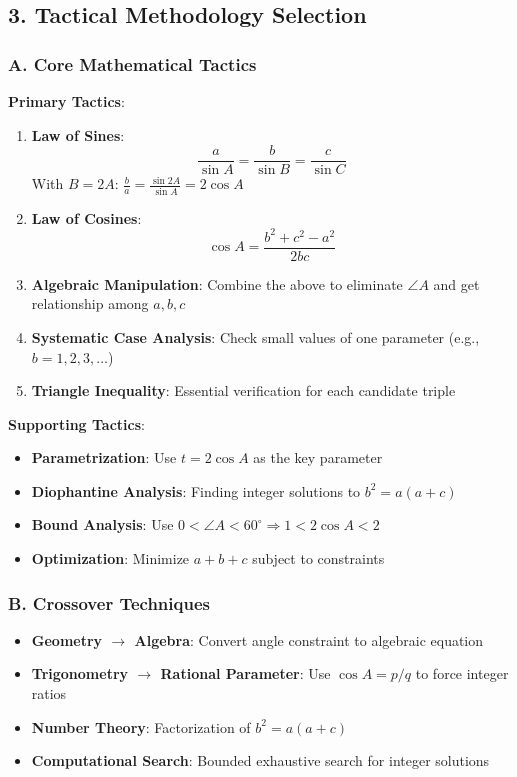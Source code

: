 \documentclass[12pt]{article}
\begin{document}
\begin{tacticalbox}
\subsection*{3. Tactical Methodology Selection}

\subsubsection*{A. Core Mathematical Tactics}

\textbf{Primary Tactics}:
\begin{enumerate}
    \item \textbf{Law of Sines}: 
    $$\frac{a}{\sin A} = \frac{b}{\sin B} = \frac{c}{\sin C}$$
    With $B = 2A$: $\frac{b}{a} = \frac{\sin 2A}{\sin A} = 2\cos A$
    
    \item \textbf{Law of Cosines}:
    $$\cos A = \frac{b^2 + c^2 - a^2}{2bc}$$
    
    \item \textbf{Algebraic Manipulation}:
    Combine the above to eliminate $\angle A$ and get relationship among $a, b, c$
    
    \item \textbf{Systematic Case Analysis}:
    Check small values of one parameter (e.g., $b = 1, 2, 3, \ldots$)
    
    \item \textbf{Triangle Inequality}:
    Essential verification for each candidate triple
\end{enumerate}

\textbf{Supporting Tactics}:
\begin{itemize}
    \item \textbf{Parametrization}: Use $t = 2\cos A$ as the key parameter
    \item \textbf{Diophantine Analysis}: Finding integer solutions to $b^2 = a(a+c)$
    \item \textbf{Bound Analysis}: Use $0 < \angle A < 60^\circ \Rightarrow 1 < 2\cos A < 2$
    \item \textbf{Optimization}: Minimize $a+b+c$ subject to constraints
\end{itemize}

\subsubsection*{B. Crossover Techniques}

\begin{itemize}
    \item \textbf{Geometry $\to$ Algebra}: Convert angle constraint to algebraic equation
    \item \textbf{Trigonometry $\to$ Rational Parameter}: Use $\cos A = p/q$ to force integer ratios
    \item \textbf{Number Theory}: Factorization of $b^2 = a(a+c)$
    \item \textbf{Computational Search}: Bounded exhaustive search for integer solutions
\end{itemize}

\end{tacticalbox}
\end{document}
